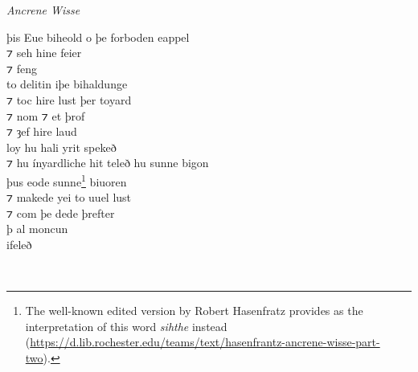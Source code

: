 \begin{texts}{\textit{Ancrene Wisse}}
\begin{textglossed}
þis Eue biheold o þe forboden eappel\\
⁊ seh hine feier\\
⁊ feng\\
to delitin iþe bihaldunge\\
⁊ toc hire lust þer toyard\\
⁊ nom ⁊ et þrof\\
⁊ ȝef hire laud\\
loy hu hali yrit spekeð\\
⁊ hu ínyardliche hit teleð hu sunne bigon\\
þus eode sunne\footnote{The well-known edited version by Robert Hasenfratz provides as the interpretation of this word \textit{sihthe} instead (\url{https://d.lib.rochester.edu/teams/text/hasenfrantz-ancrene-wisse-part-two}).} biuoren\\
⁊ makede yei to uuel lust\\
⁊ com þe dede þrefter\\
þ al moncun\\ ifeleð%

~


\end{textglossed}
\end{texts}
